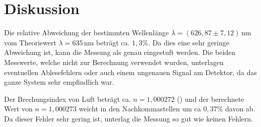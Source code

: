\section{Diskussion}
\label{sec:Diskussion}

Die relative Abweichung der bestimmten Wellenlänge $\lambda =  (626,87 \pm 7,12)\,\si{\nano\meter}$ vom Theoriewert $\lambda = 635\,\si{\nano\meter}$ beträgt ca. $1,3 \%$.
Da dies eine sehr geringe Abweichung ist, kann die Messung als genau eingestuft werden. Die beiden Messwerte, welche nicht zur Berechnung verwendet wurden, unterlagen eventuellen Ablesefehlern oder auch einem ungenauen Signal am Detektor, da das ganze System sehr empfindlich war.

\noindent Der Brechungsindex von Luft beträgt ca. $n = 1,000272$ (\cite{sample1}) und der berechnete Wert von $n = 1,000273$ weicht in den Nachkommastellen um ca $0,37 \%$ davon ab. Da dieser Fehler sehr gering ist, unterlag die Messung so gut wie keinen Fehlern.
